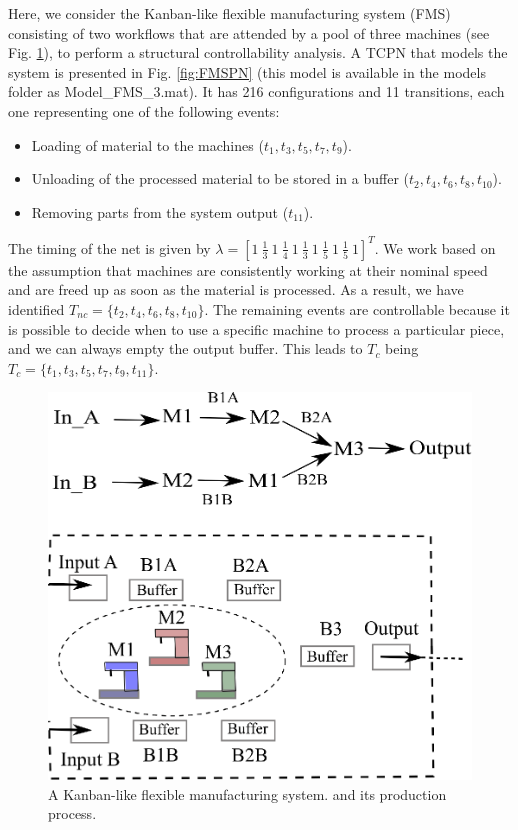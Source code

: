 Here, we consider the Kanban-like flexible manufacturing system (FMS) consisting of two workflows that are attended by a pool of three machines (see Fig. \ref{fig:layoutFINAL}), to perform a structural controllability analysis. A TCPN that models the system is presented in Fig. \ref{fig:FMSPN} (this model is available in the models folder as Model\_FMS\_3.mat). It has 216 configurations and 11 transitions, each one representing one of the following events:
\begin{itemize}
    \item Loading of material to the machines ($t_1,t_3,t_5,t_7,t_9$).
    \item Unloading of the processed material to be stored in a buffer ($t_2,t_4,t_6,t_8,t_{10}$).
    \item Removing parts from the system output ($t_{11}$).
\end{itemize}
The timing of the net is given by $\lambda = \left [1 \ \frac{1}{3} \ 1 \ \frac{1}{4} \ 1 \ \frac{1}{3} \ 1 \ \frac{1}{5} \ 1 \ \frac{1}{5} \ 1 \right ]^T$. 
We work based on the assumption that machines are consistently working at their nominal speed and are freed up as soon as the material is processed. As a result, we have identified $T_{nc}=\{t_2,t_4,t_6,t_8,t_{10}\}$. The remaining events are controllable because it is possible to decide when to use a specific machine to process a particular piece, and we can always empty the output buffer. This leads to $T_c$ being $T_{c}=\{t_1,t_3,t_5,t_7,t_{9},t_{11}\}$.

\begin{figure}[htbp]
    \centering
    \includegraphics[scale=.6]{figs/FinalExampleLayout2.eps}
    \caption{A Kanban-like flexible manufacturing system. and its production process.}
    \label{fig:layoutFINAL}
\end{figure}

